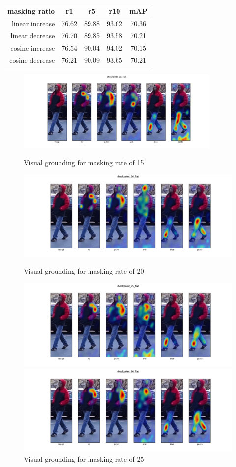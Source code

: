 \begin{tabular}{rcccc}
  masking ratio & r1 & r5 & r10 & mAP\\ \hline
  linear increase & 76.62 & 89.88 & 93.62 & 70.36 \\
  linear decrease & 76.70 & 89.85 & 93.58 & 70.21 \\
  cosine increase & 76.54 & 90.04 & 94.02 & 70.15 \\
  cosine decrease & 76.21 & 90.09 & 93.65 & 70.21 \\
\end{tabular}

\begin{figure}
  \includegraphics[width=10cm]{img/mrtd_masking_ratio/mrtd-checkpoint_15_flat.png}
  \caption{Visual grounding for masking rate of 15}
  \includegraphics[options]{img/mrtd_masking_ratio/mrtd-checkpoint_20_flat.png}
  \caption{Visual grounding for masking rate of 20}
  \includegraphics[options]{img/mrtd_masking_ratio/mrtd-checkpoint_25_flat.png}
  \caption{Visual grounding for masking rate of 25}
  \includegraphics[options]{img/mrtd_masking_ratio/mrtd-checkpoint_30_flat.png}

\end{figure}
